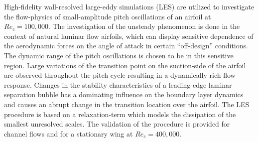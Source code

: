 %
\graphicspath{{paper3/imgs/}}%
%
%
%
\setlength{\belowcaptionskip}{-2pt}
\begin{paper}

\makepapertitle

%
\begin{paperabstract}
	High-fidelity wall-resolved large-eddy simulations (LES) are utilized to investigate the flow-physics of small-amplitude pitch oscillations of an airfoil at $Re_{c}=100,000$. The investigation of the unsteady phenomenon is done in the context of natural laminar flow airfoils, which can display sensitive dependence of the aerodynamic forces on the angle of attack in certain ``off-design'' conditions. The dynamic range of the pitch oscillations is chosen to be in this sensitive region. Large variations of the transition point on the suction-side of the airfoil are observed throughout the pitch cycle resulting in a dynamically rich flow response. Changes in the stability characteristics of a leading-edge laminar separation bubble has a dominating influence on the boundary layer dynamics and causes an abrupt change in the transition location over the airfoil. The LES procedure is based on a relaxation-term which models the dissipation of the smallest unresolved scales. The validation of the procedure is provided for channel flows and for a stationary wing at $Re_{c}=400,000$.
\end{paperabstract}


%



%


%


\end{paper}
